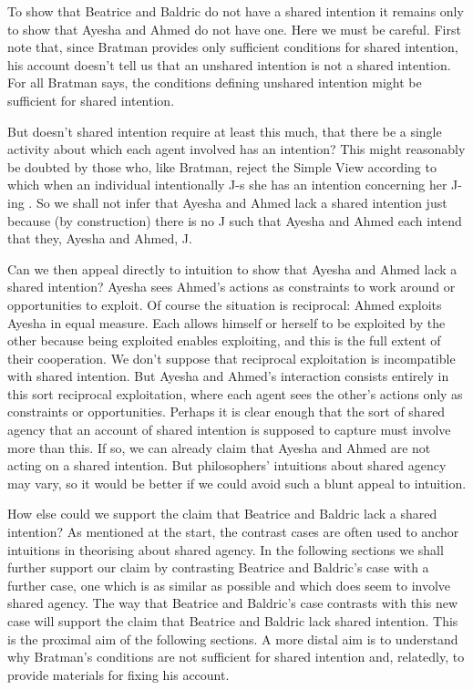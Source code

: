 \documentclass[12pt,\papersize]{extarticle}
\begin{document}
To show that Beatrice and Baldric do not have a shared intention it remains only to show that Ayesha and Ahmed do not have one. 
Here we must be careful.
First note that,
	 since Bratman provides only sufficient conditions for shared intention, 
	 his account doesn't tell us that an unshared intention is not a shared intention.
For all Bratman says, the conditions defining unshared intention might  be sufficient for shared intention. 

But doesn't shared intention require at least this much,
that there be a single activity  about which each agent involved has an intention? 
This might reasonably be doubted by those who, like Bratman, reject the Simple View according to which when an individual intentionally J-s she has an intention concerning her J-ing \citep{Bratman:1984jr}.
So 
	we shall not infer  that Ayesha and Ahmed lack a shared intention
	just because (by construction) there is no J such that Ayesha and Ahmed each intend that they, Ayesha and Ahmed, J.

Can we then appeal directly to intuition to show that Ayesha and Ahmed lack a shared intention?
Ayesha sees Ahmed's actions as constraints to work around or  opportunities to exploit.
Of course the situation is reciprocal: Ahmed exploits Ayesha in equal measure.
Each allows himself or herself to be exploited by the other because being exploited enables exploiting,
and this is the full extent of their cooperation. 
We don't suppose that reciprocal exploitation is incompatible with shared intention. 
But Ayesha and Ahmed's interaction consists entirely in this sort reciprocal exploitation, where each agent sees the other's actions only as constraints or opportunities.
Perhaps it is clear enough that 
the sort of shared agency that an account of shared intention is supposed to capture must involve more than this. 
If so, we can already claim that Ayesha and Ahmed are not acting on a shared intention.
But philosophers' intuitions about shared agency may vary, so it would be better if we could avoid such a blunt appeal to intuition.

How else could we support the claim that Beatrice and Baldric lack a shared intention? 
As mentioned at the start, 
the contrast cases are often used to anchor intuitions in theorising about shared agency.
In the following sections we shall further support our claim by contrasting Beatrice and Baldric's case with a further case, one which is as similar as possible and which does seem to involve shared agency.
The way that Beatrice and Baldric's case contrasts with this new case will support the claim that Beatrice and Baldric lack shared intention.
This is the proximal aim of the following sections.
A more distal aim 
is to understand why Bratman's conditions are not sufficient for shared intention
and, relatedly, to provide materials for fixing his account.
\end{document}
